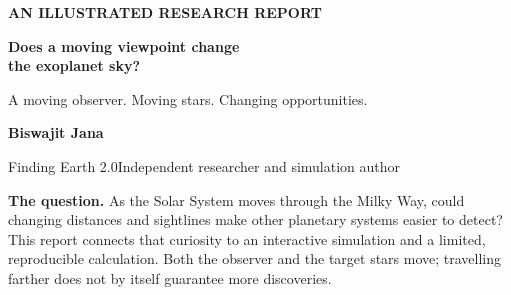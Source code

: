 \begin{center}
 {\sffamily\small\bfseries\color{teal}AN ILLUSTRATED RESEARCH REPORT}\par\vspace{7pt}
 {\fontsize{25}{28}\selectfont\bfseries Does a moving viewpoint change\\the exoplanet sky?}\par\vspace{8pt}
 {\large A moving observer. Moving stars. Changing opportunities.}\par\vspace{9pt}
 {\large\textbf{Biswajit Jana}}\par
 {\sffamily\small Finding Earth 2.0\enspace\textbar\enspace Independent researcher and simulation author}
\end{center}
\vspace{5pt}
\textbf{The question.} As the Solar System moves through the Milky Way, could changing distances and sightlines make other planetary systems easier to detect? This report connects that curiosity to an interactive simulation and a limited, reproducible calculation. Both the observer and the target stars move; travelling farther does not by itself guarantee more discoveries.

